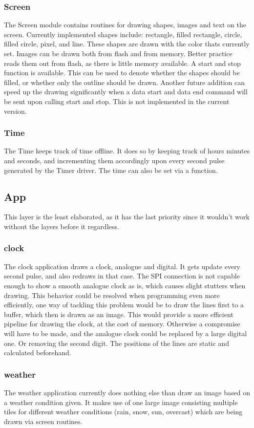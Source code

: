 \subsubsection{Screen}
The Screen module contains routines for drawing shapes, images and text on the screen. Currently implemented shapes include: rectangle, filled rectangle, circle, filled circle, pixel, and line. These shapes are drawn with the color thats currently set. Images can be drawn both from flash and from memory. Better practice reads them out from flash, as there is little memory available. A start and stop function is available. This can be used to denote whether the shapes should be filled, or whether only the outline should be drawn. Another future addition can speed up the drawing significantly when a data start and data end command will be sent upon calling start and stop. This is not implemented in the current version.
\subsubsection{Time}
The Time keeps track of time offline. It does so by keeping track of hours minutes and seconds, and incrementing them accordingly upon every second pulse generated by the Timer driver. The time can also be set via a function.
\subsection{App}
This layer is the least elaborated, as it has the last priority since it wouldn't work without the layers before it regardless.
\subsubsection{clock}
The clock application draws a clock, analogue and digital. It gets update every second pulse, and also redraws in that case. The SPI connection is not capable enough to show a smooth analogue clock as is, which causes slight stutters when drawing. This behavior could be resolved when programming even more efficiently, one way of tackling this problem would be to draw the lines first to a buffer, which then is drawn as an image. This would provide a more efficient pipeline for drawing the clock, at the cost of memory. Otherwise a compromise will have to be made, and the analogue clock could be replaced by a large digital one. Or removing the second digit. The positions of the lines are static and calculated beforehand.
\subsubsection{weather}
The weather application currently does nothing else than draw an image based on a weather condition given. It makes use of one large image consisting multiple tiles for different weather conditions (rain, snow, sun, overcast) which are being drawn via screen routines.
